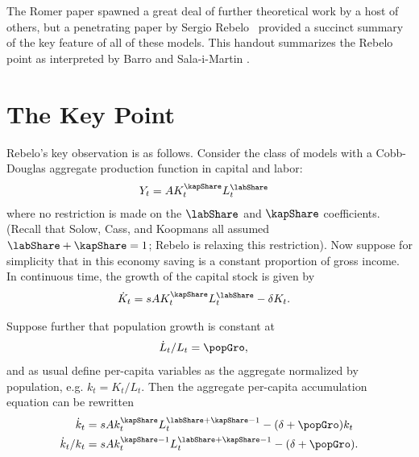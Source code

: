 \documentclass{handout}
\begin{document}
The Romer paper spawned a great deal of further theoretical work by 
a host of others, but a penetrating
paper by Sergio Rebelo~\cite{rebelo:long} provided a succinct summary
of the key feature of all of these models.  This handout summarizes
the Rebelo point as interpreted by Barro and Sala-i-Martin
\cite{barro&salaimartin:book}.

\section{The Key Point}
Rebelo's key observation is as follows.  Consider the class of models
with a Cobb-Douglas aggregate production function in capital and labor:
\begin{equation}\begin{gathered}\begin{aligned}
  \label{eq:prodfn}
  Y_t & =  A K_t^\kapShare L_t^\labShare
\end{aligned}\end{gathered}\end{equation}
where no restriction is made on the $\labShare$ and $\kapShare$ coefficients.
(Recall that Solow, Cass, and Koopmans all assumed $\labShare+\kapShare=1$; 
Rebelo is relaxing this restriction).  Now suppose for simplicity that
in this economy saving is a constant proportion of gross income.
In continuous time, the growth of the capital stock is given by
\begin{equation}\begin{gathered}\begin{aligned}
  \label{eq:dbc}
  \dot{K}_t & =  s A K_t^\kapShare L_t^\labShare - \delta K_t.
\end{aligned}\end{gathered}\end{equation}

Suppose further that population growth is constant at
\begin{equation}\begin{gathered}\begin{aligned}
  \label{eq:n}
  \dot{L}_t/L_t & =  \popGro,
\end{aligned}\end{gathered}\end{equation}
and as usual define per-capita variables as the aggregate normalized
by population, e.g. $k_t = K_t/L_t$.  Then the aggregate per-capita accumulation
equation can be rewritten
\begin{equation}\begin{gathered}\begin{aligned}
  \dot{k}_t & =  s A k_t^\kapShare L^{\labShare+\kapShare-1}_t - (\delta+\popGro) k_t
\\ \dot{k}_{t}/k_{t} & =  s A k_{t}^{\kapShare-1} L^{\labShare+\kapShare-1}_{t}-(\delta+\popGro) .  \label{eq:dbcpc}
\end{aligned}\end{gathered}\end{equation}
\end{document}
